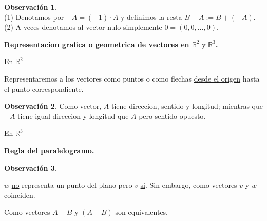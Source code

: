 \documentclass{article}
\theoremstyle{definition}
\newtheorem*{obs}{Observación}
\theoremstyle{remark}
\newcommand\R{\ensuremath{\mathbb{R}}}
\begin{document}
\begin{obs} \; \\
  (1) Denotamos por $-A=(-1)\cdot A$ y definimos la resta $B-A:=B+(-A)$. \\
  (2) A veces denotamos al vector nulo simplemente $0=(0,0, \dots, 0).$
\end{obs}

\begin{center}
  \textbf{Representacion grafica o geometrica de vectores en $\mathbb{R}^2 \text{ y } \mathbb{R}^3$.}
\end{center}
En $\R^2$
\begin{figure}[h]
\centering
\def\svgwidth{0.75\textwidth}

\end{figure}

Representaremos a los vectores como puntos o como flechas \underline{desde el origen} hasta el punto correspondiente. \begin{obs}
  Como vector, $A$ tiene direccion, sentido y longitud; mientras que $-A$ tiene igual direccion y longitud que $A$ pero sentido opuesto.
\end{obs}
\pagebreak
En $\R^3$
\begin{figure}[h]
\centering
\def\svgwidth{1\textwidth}

\end{figure}

\begin{center}
\textbf{Regla del paralelogramo.}
\end{center}

\begin{figure}[h]
\centering
\def\svgwidth{1\textwidth}

\end{figure}

\pagebreak
\begin{obs}
  \;
\end{obs}
$w$ \underline{no} representa un punto del plano pero $v$ \underline{si}. Sin embargo, como vectores $v$ y $w$ coinciden.

\begin{figure}[h]
\centering
\def\svgwidth{0.45\textwidth}

\end{figure}
Como vectores $A-B$ y $(A-B)$ son equivalentes.
\begin{figure}[h]
\centering
\def\svgwidth{0.75\textwidth}

\end{figure}
\end{document}
